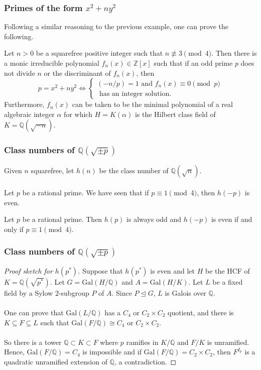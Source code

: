 \documentclass{beamer}
\newcommand{\Gal}{\mathrm{Gal}}
\newcommand{\QQ}{\mathbb{Q}}
\newcommand{\ZZ}{\mathbb{Z}}
\theoremstyle{plain}
\begin{document}
\begin{frame}
    \frametitle{Primes of the form $x^2+ny^2$}
    Following a similar reasoning to the previous example, one can prove the following.
    \pause
    \begin{theorem}
        Let $n>0$ be a squarefree positive integer such that $n\not\equiv3\pmod{4}$. \pause Then there is a monic irreducible polynomial $f_n(x)\in\ZZ[x]$ such that if an odd prime $p$ does not divide $n$ or the discriminant of $f_n(x)$, then 
        \[
        p=x^2+ny^2\iff
        \begin{cases}
            (-n/p)=1 \text{ and }f_n(x)\equiv0\pmod{p}\\
            \text{ has an integer solution.}
        \end{cases}    
        \]     
        \pause
        Furthermore, $f_n(x)$ can be taken to be the minimal polynomial of a real algebraic integer $\alpha$ for which $H=K(\alpha)$ is the Hilbert class field of $K=\QQ(\sqrt{-n})$. 
    \end{theorem}
\end{frame}

\begin{frame}
    \frametitle{Class numbers of $\QQ(\sqrt{\pm p})$}
    Given $n$ squarefree, let $h(n)$ be the class number of $\QQ(\sqrt{n})$. \pause
    \\~\\
    Let $p$ be a rational prime. We have seen that if $p\equiv1\pmod{4}$, then $h(-p)$ is even. \pause

    \begin{theorem}
        Let $p$ be a rational prime. Then $h(p)$ is always odd and $h(-p)$ is even if and only if $p\equiv1\pmod{4}$.
    \end{theorem}
    
\end{frame}
\begin{frame}
    \frametitle{Class numbers of $\QQ(\sqrt{\pm p})$}
    \begin{proof}[Proof sketch for $h(p^*)$]
        Suppose that $h(p^*)$ is even and let $H$ be the HCF of $K=\QQ(\sqrt{p^*})$. Let $G=\Gal(H/\QQ)$ and $A=\Gal(H/K)$. \pause Let $L$ be a fixed field by a Sylow $2$-subgroup $P$ of $A$. Since $P\trianglelefteq G$, $L$ is Galois over $\QQ$. \pause
        \\~\\
        One can prove that $\Gal(L/\QQ)$ has a $C_4$ or $C_2\times C_2$ quotient, and there is $K\subseteq F\subseteq L$ such that $\Gal(F/\QQ)\cong C_4$ or $C_2\times C_2$. \pause
        \\~\\
        So there is a tower $\QQ\subset K\subset F$ where $p$ ramifies in $K/\QQ$ and $F/K$ is unramified. \pause Hence, $\Gal(F/\QQ)=C_4$ is impossible and if $\Gal(F/\QQ)=C_2\times C_2$, then $F^{I_p}$ is a quadratic unramified extension of $\QQ$, a contradiction.
    \end{proof}
\end{frame}
\end{document}
